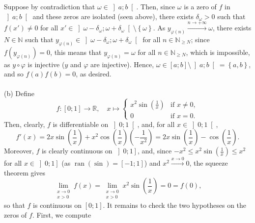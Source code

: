 \begin{solution}
    \\\\
    Suppose by contradiction that \( \omega \in \left]a;b\right[ \). Then, since \( \omega \) is a zero of \( f \) in \( \left]a;b\right[ \) and these zeros are isolated (seen above), there exists \( \delta_\omega > 0 \) such that \( f\left(x'\right) \neq 0 \) for all \( x' \in \left]\omega-\delta_\omega;\omega+\delta_\omega\right[ \setminus \left\{\omega\right\} \). As \( y_{\varphi\left(n\right)} \overset{n \to +\infty}{\longrightarrow} \omega \), there exists \( N \in \mathbb{N} \) such that \( y_{\varphi\left(n\right)} \in \left]\omega-\delta_\omega;\omega+\delta_\omega\right[ \) for all \( n \in \mathbb{N}_{\geq N} \); since \( f\left(y_{\varphi\left(n\right)}\right) = 0 \), this means that \( y_{\varphi\left(n\right)} = \omega \) for all \( n \in \mathbb{N}_{\geq N} \), which is impossible, as \( y \circ \varphi \) is injective (\( y \) and \( \varphi \) are injective). Hence, \( \omega \in \left[a;b\right] \setminus \left]a;b\right[ = \left\{a, b\right\} \), and so \( f\left(a\right)f\left(b\right) = 0 \), as desired.
    \\\\
    (b) Define
    \[
        f \colon \left[0;1\right] \longrightarrow \mathbb{R}, \quad x \longmapsto
        \begin{cases}
            x^2\sin\left(\frac{1}{x}\right) & \text{if } x \neq 0, \\
            0 & \text{if } x = 0.
        \end{cases}
    \]
    Then, clearly, \( f \) is differentiable on \( \left]0;1\right[ \), and, for all \( x \in \left]0;1\right[ \),
    \[
        f'\left(x\right) = 2x\sin\left(\frac{1}{x}\right)+x^2\cos\left(\frac{1}{x}\right)\left(-\frac{1}{x^2}\right) = 2x\sin\left(\frac{1}{x}\right)-\cos\left(\frac{1}{x}\right).
    \]
    Moreover, \( f \) is clearly continuous on \( \left]0;1\right] \), and, since \( -x^2 \leq x^2\sin\left(\frac{1}{x}\right) \leq x^2 \) for all \( x \in \left]0;1\right] \) (as \( \operatorname{ran}\left(\sin\right) = \left[-1;1\right] \)) and \( x^2 \overset{x \to 0}{\longrightarrow} 0 \), the squeeze theorem gives
    \[
        \lim_{\substack{x \to 0 \\ x > 0}} f\left(x\right) = \lim_{\substack{x \to 0 \\ x > 0}} x^2\sin\left(\frac{1}{x}\right) = 0 = f\left(0\right),
    \]
    so that \( f \) is continuous on \( \left[0;1\right] \). It remains to check the two hypotheses on the zeros of \( f \). First, we compute

\end{solution}

